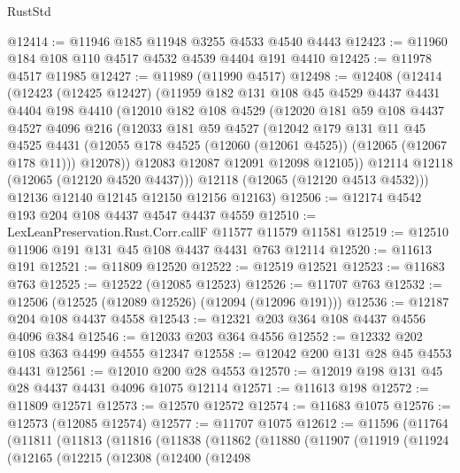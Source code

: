 \begin{lexlean}{RustStd}
\begin{coremodule}
@12414 := @11946 @185 @11948 @3255 @4533 @4540 @4443
@12423 := @11960 @184 @108 @110 @4517 @4532 @4539 @4404 @191 @4410
@12425 := @11978 @4517 @11985
@12427 := @11989 (@11990 @4517)
@12498 := @12408
    (@12414
      (@12423
        (@12425 @12427)
        (@11959
          @182
          @131
          @108
          @45
          @4529
          @4437
          @4431
          @4404
          @198
          @4410
          (@12010
            @182
            @108
            @4529
            (@12020
              @181
              @59
              @108
              @4437
              @4527
              @4096
              @216
              (@12033
                @181
                @59
                @4527
                (@12042
                  @179
                  @131
                  @11
                  @45
                  @4525
                  @4431
                  (@12055 @178 @4525 (@12060 (@12061 @4525)) (@12065 (@12067 @178 @11)))
                  @12078))
              @12083
              @12087
              @12091
              @12098
              @12105))
          @12114
          @12118
          (@12065 (@12120 @4520 @4437)))
        @12118
        (@12065 (@12120 @4513 @4532)))
      @12136
      @12140
      @12145
      @12150
      @12156
      @12163)
@12506 := @12174 @4542 @193 @204 @108 @4437 @4547 @4437 @4559
@12510 := LexLeanPreservation.Rust.Corr.callF @11577 @11579 @11581
@12519 := @12510 @11906 @191 @131 @45 @108 @4437 @4431 @763 @12114
@12520 := @11613 @191
@12521 := @11809 @12520
@12522 := @12519 @12521
@12523 := @11683 @763
@12525 := @12522 (@12085 @12523)
@12526 := @11707 @763
@12532 := @12506 (@12525 (@12089 @12526) (@12094 (@12096 @191)))
@12536 := @12187 @204 @108 @4437 @4558
@12543 := @12321 @203 @364 @108 @4437 @4556 @4096 @384
@12546 := @12033 @203 @364 @4556
@12552 := @12332 @202 @108 @363 @4499 @4555 @12347
@12558 := @12042 @200 @131 @28 @45 @4553 @4431
@12561 := @12010 @200 @28 @4553
@12570 := @12019 @198 @131 @45 @28 @4437 @4431 @4096 @1075 @12114
@12571 := @11613 @198
@12572 := @11809 @12571
@12573 := @12570 @12572
@12574 := @11683 @1075
@12576 := @12573 (@12085 @12574)
@12577 := @11707 @1075
@12612 := @11596
    (@11764
      (@11811
        (@11813
          (@11816
            (@11838
              (@11862
                (@11880
                  (@11907
                    (@11919
                      (@11924
                        (@12165
                          (@12215
                            (@12308
                              (@12400
                                (@12498

\end{coremodule}
\end{lexlean}
